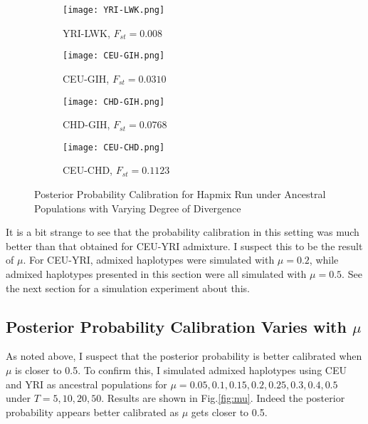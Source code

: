 \documentclass{article}
\begin{document}
     \begin{figure}[H]
     \centering
     \begin{subfigure}[b]{0.45\textwidth}
         \centering
         \texttt{[image: YRI-LWK.png]}
         \caption{YRI-LWK, $F_{st}=0.008$}
         \label{fig:YRI-LWK}
     \end{subfigure}
     \hfill
     \begin{subfigure}[b]{0.45\textwidth}
         \centering
         \texttt{[image: CEU-GIH.png]}
         \caption{CEU-GIH, $F_{st}=0.0310$}
         \label{fig:CEU-GIH}
     \end{subfigure}
     \vfill
     \begin{subfigure}[b]{0.45\textwidth}
         \centering
         \texttt{[image: CHD-GIH.png]}
         \caption{CHD-GIH, $F_{st}=0.0768$}
         \label{fig:CHD-GIH}
     \end{subfigure}
     \hfill
     \begin{subfigure}[b]{0.45\textwidth}
         \centering
         \texttt{[image: CEU-CHD.png]}
         \caption{CEU-CHD, $F_{st}=0.1123$}
         \label{fig:CEU-CHD}
     \end{subfigure}
        \caption{Posterior Probability Calibration for Hapmix Run under Ancestral Populations with Varying Degree of Divergence}
        \label{fig:similarPop}
\end{figure}
    

It is a bit strange to see that the probability calibration in this setting was much better than that obtained for CEU-YRI admixture. I suspect this to be the result of $\mu$. For CEU-YRI, admixed haplotypes were simulated with $\mu=0.2$, while admixed haplotypes presented in this section were all simulated with $\mu=0.5$. See the next section for a simulation experiment about this.

\subsection{Posterior Probability Calibration Varies with $\mu$}

As noted above, I suspect that the posterior probability is better calibrated when $\mu$ is closer to 0.5. To confirm this, I simulated admixed haplotypes using CEU and YRI as ancestral populations for $\mu=0.05,0.1,0.15,0.2,0.25,0.3,0.4,0.5$ under $T=5,10,20,50$. Results are shown in Fig.\ref{fig:mu}. Indeed the posterior probability appears better calibrated as $\mu$ gets closer to 0.5. 
\end{document}
